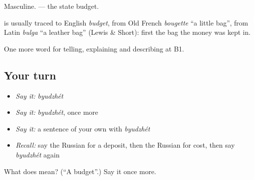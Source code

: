 Masculine. \emph{ } — the state budget.

\begin{cousinweb}
\textbf{} is usually traced to English \emph{budget}, from Old French \emph{bougette} \textquotedblleft{}a little bag\textquotedblright{}, from Latin \emph{bulga} \textquotedblleft{}a leather bag\textquotedblright{} (Lewis \& Short): first the bag the money was kept in.
\end{cousinweb}

\begin{grammarlens}[title={What you've built}]
One more word for telling, explaining and describing at B1.
\end{grammarlens}

\subsection*{Your turn}
\begin{itemize}
\raggedright
  \item \emph{Say it:} \emph{byudzhét}
  \item \emph{Say it:} \emph{byudzhét}, once more
  \item \emph{Say it:} a sentence of your own with \emph{byudzhét}
  \item \emph{Recall:} say the Russian for a deposit, then the Russian for cost, then say \emph{byudzhét} again
\end{itemize}

\begin{tcolorbox}[breakable,colback=teal!4,colframe=teal!35!black,title={Before you move on}]
What does  mean? (\textquotedblleft{}A budget\textquotedblright{}.) Say it once more.
\end{tcolorbox}
